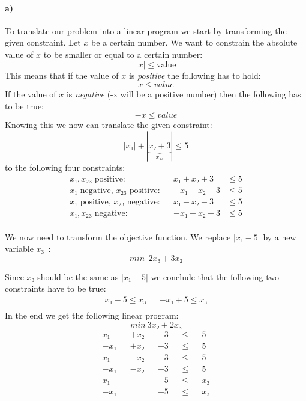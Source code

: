 \documentclass[a4paper, 12pt]{report}
\begin{document}
\paragraph{a)} To translate our problem into a linear program we start by
transforming the given constraint. Let $x$ be a certain number. We want to
constrain the absolute value of $x$ to be smaller or equal to a certain number:
\[
    |x|≤\text{value}
\]
This means that if the value of $x$ is \emph{positive} the following has to
hold:
\[
    x≤value
\]
If the value of $x$ is \emph{negative} (-x will be a positive number) then the
following has to be true:
\[
    -x≤value
\]
Knowing this we now can translate the given constraint:
\[
    |x₁| + |\underbrace{x₂ + 3}_{x₂₃}| ≤ 5
\]
to the following four constraints:
\begin{align*}
    &&&& \text{$x₁, x₂₃$ positive:}            &&  x₁ + x₂ + 3  & ≤ 5 &&&&\\
    &&&& \text{$x₁$ negative, $x₂₃$ positive:} && -x₁ + x₂ + 3  & ≤ 5 &&&&\\
    &&&& \text{$x₁$ positive, $x₂₃$ negative:} &&  x₁ - x₂ - 3  & ≤ 5 &&&&\\
    &&&& \text{$x₁, x₂₃$ negative:}            && -x₁ - x₂ - 3  & ≤ 5 &&&&\\
\end{align*}

We now need to transform the objective function. We replace $|x₁-5|$ by a new
variable $x₃$~\cite{LP_Solve_Absolute_Values}:
\[
    min ~~ 2x₃+ 3x₂
\]

Since $x₃$ should be the same as $|x₁-5|$ we conclude that the following two
constraints have to be true:
\begin{align*}
    x₁-5 ≤ x₃ && -x₁+5 ≤ x₃\\
\end{align*}
In the end we get the following linear program:
\[
    min~ 3x₂ + 2x₃
\]
\begin{align*}
     x₁ && +x₂ && +3  && ≤ && 5  \\
    -x₁ && +x₂ && +3  && ≤ && 5  \\
     x₁ && -x₂ && -3  && ≤ && 5  \\
    -x₁ && -x₂ && -3  && ≤ && 5  \\
     x₁ &&     && -5  && ≤ && x₃ \\
    -x₁ &&     && +5  && ≤ && x₃ \\
\end{align*}
\end{document}
